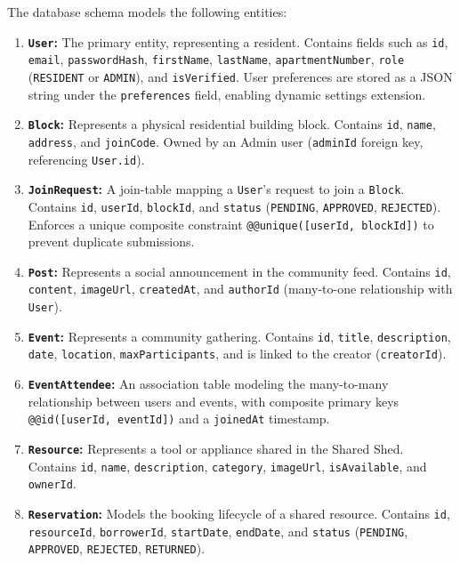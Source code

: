 The database schema models the following entities:
\begin{enumerate}
    \item \textbf{\texttt{User}:} The primary entity, representing a resident. Contains fields such as \texttt{id}, \texttt{email}, \texttt{passwordHash}, \texttt{firstName}, \texttt{lastName}, \texttt{apartmentNumber}, \texttt{role} (\texttt{RESIDENT} or \texttt{ADMIN}), and \texttt{isVerified}. User preferences are stored as a JSON string under the \texttt{preferences} field, enabling dynamic settings extension.
    \item \textbf{\texttt{Block}:} Represents a physical residential building block. Contains \texttt{id}, \texttt{name}, \texttt{address}, and \texttt{joinCode}. Owned by an Admin user (\texttt{adminId} foreign key, referencing \texttt{User.id}).
    \item \textbf{\texttt{JoinRequest}:} A join-table mapping a \texttt{User}'s request to join a \texttt{Block}. Contains \texttt{id}, \texttt{userId}, \texttt{blockId}, and \texttt{status} (\texttt{PENDING}, \texttt{APPROVED}, \texttt{REJECTED}). Enforces a unique composite constraint \texttt{@@unique([userId, blockId])} to prevent duplicate submissions.
    \item \textbf{\texttt{Post}:} Represents a social announcement in the community feed. Contains \texttt{id}, \texttt{content}, \texttt{imageUrl}, \texttt{createdAt}, and \texttt{authorId} (many-to-one relationship with \texttt{User}).
    \item \textbf{\texttt{Event}:} Represents a community gathering. Contains \texttt{id}, \texttt{title}, \texttt{description}, \texttt{date}, \texttt{location}, \texttt{maxParticipants}, and is linked to the creator (\texttt{creatorId}).
    \item \textbf{\texttt{EventAttendee}:} An association table modeling the many-to-many relationship between users and events, with composite primary keys \texttt{@@id([userId, eventId])} and a \texttt{joinedAt} timestamp.
    \item \textbf{\texttt{Resource}:} Represents a tool or appliance shared in the Shared Shed. Contains \texttt{id}, \texttt{name}, \texttt{description}, \texttt{category}, \texttt{imageUrl}, \texttt{isAvailable}, and \texttt{ownerId}.
    \item \textbf{\texttt{Reservation}:} Models the booking lifecycle of a shared resource. Contains \texttt{id}, \texttt{resourceId}, \texttt{borrowerId}, \texttt{startDate}, \texttt{endDate}, and \texttt{status} (\texttt{PENDING}, \texttt{APPROVED}, \texttt{REJECTED}, \texttt{RETURNED}).

\end{enumerate}
